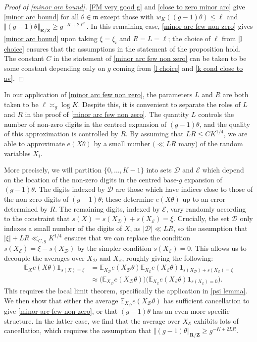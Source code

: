 \documentclass[hidelinks,11pt,reqno]{amsart}
\renewcommand{\leq}{\leqslant}
\renewcommand{\geq}{\geqslant}
\newcommand{\Z}{\ensuremath{\mathbf{Z}}}
\newcommand{\R}{\ensuremath{\mathbf{R}}}
\newcommand{\E}{\ensuremath{\mathbb{E}}}
\newcommand{\ind}{\mathbf{1}}
\newcommand{\xb}{X}
\newcommand{\xbd}{X_{\mathcal{D}}}
\newcommand{\xbee}{X_{\mathcal{E}}}
\newcommand{\Vertr}{\Vert_{\R/\Z}}
\newcommand{\sx}[1]{s(#1)}
\newcommand{\V}[1]{\Vert #1 \Vertr}
\theoremstyle{remark}
\begin{document}
\begin{proof}[Proof of \cref{minor arc bound}]
\cref{FM very good g} and \cref{close to zero minor arc} give \cref{minor arc bound} for all $\theta\in \mathfrak{m}$ except those with $w_{K}((g-1)\theta)\leq \ell$ and $\V{(g-1)\theta}\geq g^{-K+2\ell^{2}}$. In this remaining case, \cref{minor arc few non zero} gives \cref{minor arc bound} upon taking $\xi=\xi_{i}$ and $R=L=\ell$; the choice of $\ell$ from \cref{l choice} ensures that the assumptions in the statement of the proposition hold. The constant $C$ in the statement of \cref{minor arc few non zero} can be taken to be some constant depending only on $g$ coming from \cref{l choice} and \cref{k cond close to av}.
\end{proof}
In our application of \cref{minor arc few non zero}, the parameters $L$ and $R$ are both taken to be $\ell\asymp_{g}\log K$. Despite this, it is convenient to separate the roles of $L$ and $R$ in the proof of \cref{minor arc few non zero}. The quantity $L$ controls the number of non-zero digits in the centred expansion of $(g-1)\theta$, and the quality of this approximation is controlled by $R$. By assuming that $LR\leq CK^{1/4}$, we are able to approximate $e(X\theta)$ by a small number $(\ll LR$ many) of the random variables $X_{i}$. 

More precisely, we will partition $\{0,\ldots, K-1\}$ into sets $\mathcal{D}$ and $\mathcal{E}$ which depend on the location of the non-zero digits in the centred base-$g$ expansion of $(g-1)\theta$. The digits indexed by $\mathcal{D}$ are those which have indices close to those of the non-zero digits of $(g-1)\theta$; these determine $e(\xb\theta)$ up to an error determined by $R$. The remaining digits, indexed by $\mathcal{E}$, vary randomly according to the constraint that $\sx{\xb}=\sx{\xbd}+\sx{\xbee}=\xi$. Crucially, the set $\mathcal{D}$ only indexes a small number of the digits of $X$, as $|\mathcal{D}|\ll LR$, so the assumption that $|\xi|+LR\ll_{C,g} K^{1/4}$ ensures that we can replace the condition $s(\xbee)=\xi-s(\xbd)$ by the simpler condition $s(\xbee)=0$. This allows us to decouple the averages over $\xbd$ and $\xbee$, roughly giving the following:
\begin{align}
    \E_{\xb}e(\xb\theta)\ind_{\sx{\xb}=\xi}&=\E_{\xbd}e(\xbd\theta)\E_{\xbee}e(\xbee\theta)\ind_{\sx{\xbd}+\sx{\xbee}=\xi}\nonumber\\
    &\approx \big ( \E_{\xbd}e(\xbd\theta)\big )\big(\E_{\xbee}e(\xbee\theta) \ind_{\sx{\xbee}=0}\big).\label{decouple outine}
\end{align}
This requires the local limit theorem, specifically the application in \cref{psi lemma}. We then show that either the average $\E_{\xbd}e(\xbd\theta)$ has sufficient cancellation to give \cref{minor arc few non zero}, or that $(g-1)\theta$ has an even more specific structure. In the latter case, we find that the average over $\xbee$ exhibits lots of cancellation, which requires the assumption that $\V{(g-1)\theta}\geq g^{-K+2LR}$.  
\end{document}

